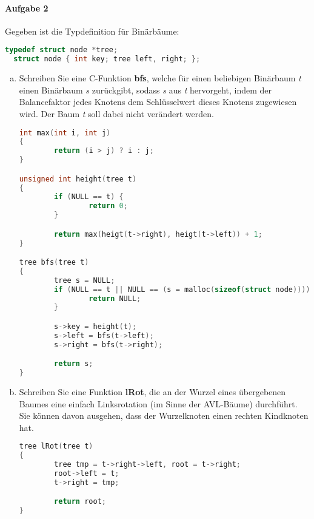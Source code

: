 \documentclass{scrreprt}
\begin{document}
\paragraph{Aufgabe 2}
Gegeben ist die Typdefinition für Binärbäume:
\begin{lstlisting}[language=C]
  typedef struct node *tree;
  struct node { int key; tree left, right; };
\end{lstlisting}
\begin{enumerate}[a)]
\item Schreiben Sie eine C-Funktion \textbf{bfs}, welche für einen beliebigen
  Binärbaum \emph{t} einen Binärbaum \emph{s} zurückgibt, sodass \emph{s} aus
  \emph{t} hervorgeht, indem der Balancefaktor jedes Knotens dem Schlüsselwert
  dieses Knotens zugewiesen wird.
  Der Baum \emph{t} soll dabei nicht verändert werden.

  \begin{lstlisting}[language=C]
int max(int i, int j)
{
        return (i > j) ? i : j;
}

unsigned int height(tree t)
{
        if (NULL == t) {
                return 0;
        }

        return max(heigt(t->right), heigt(t->left)) + 1;
}

tree bfs(tree t)
{
        tree s = NULL;
        if (NULL == t || NULL == (s = malloc(sizeof(struct node)))) {
                return NULL;
        }

        s->key = height(t);
        s->left = bfs(t->left);
        s->right = bfs(t->right);

        return s;
}
  \end{lstlisting}

\newpage
\item Schreiben Sie eine Funktion \textbf{lRot}, die an der Wurzel eines
  übergebenen Baumes eine einfach Linksrotation (im Sinne der AVL-Bäume)
  durchführt.
  Sie können davon ausgehen, dass der Wurzelknoten einen rechten Kindknoten hat.

  \begin{lstlisting}[language=C]
tree lRot(tree t)
{
        tree tmp = t->right->left, root = t->right;
        root->left = t;
        t->right = tmp;

        return root;
}
  \end{lstlisting}
\end{enumerate}
\end{document}
